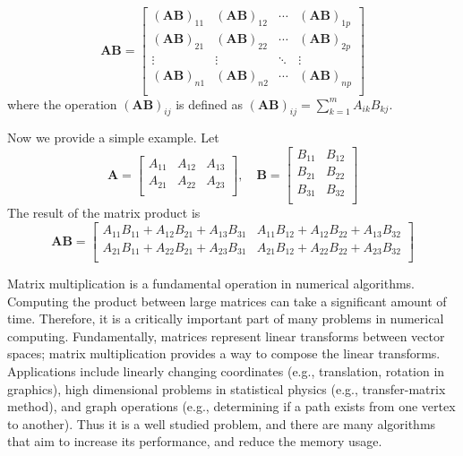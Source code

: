 \begin{equation}
\mathbf{AB} = \begin{bmatrix}
 \left(\mathbf{AB}\right)_{11} & \left(\mathbf{AB}\right)_{12} & \cdots & \left(\mathbf{AB}\right)_{1p} \\
 \left(\mathbf{AB}\right)_{21} & \left(\mathbf{AB}\right)_{22} & \cdots & \left(\mathbf{AB}\right)_{2p} \\
\vdots & \vdots & \ddots & \vdots \\
 \left(\mathbf{AB}\right)_{n1} & \left(\mathbf{AB}\right)_{n2} & \cdots & \left(\mathbf{AB}\right)_{np} \\
\end{bmatrix}
\end{equation} where the operation $\left(\mathbf{AB}\right)_{ij}$ is defined as $\left(\mathbf{A}\mathbf{B}\right)_{ij} = \sum_{k=1}^m A_{ik}B_{kj}$.

Now we provide a simple example. Let
\begin{equation}
\mathbf{A} =
 \begin{bmatrix}
 \label{eq:ABmatrix}
  A_{11} & A_{12}  &  A_{13} \\
  A_{21} & A_{22} & A_{23} \\
 \end{bmatrix},  \quad
\mathbf{B} =
 \begin{bmatrix}
  B_{11} & B_{12}  \\
  B_{21} & B_{22}   \\
   B_{31} & B_{32}  \\
 \end{bmatrix}
\end{equation}
The result of the matrix product is
\begin{equation}\label{eq:ABmatrix_product}\mathbf{AB} = \begin{bmatrix}
 A_{11}B_{11} + A_{12}B_{21} + A_{13}B_{31} & A_{11}B_{12} + A_{12}B_{22} + A_{13}B_{32} \\
 A_{21}B_{11} + A_{22}B_{21} + A_{23}B_{31} & A_{21}B_{12} + A_{22}B_{22} + A_{23}B_{32}\\
\end{bmatrix}
\end{equation}

Matrix multiplication is a fundamental operation in numerical algorithms. Computing the product between large matrices can take a significant amount of time. Therefore, it is a critically important part of many problems in numerical computing. Fundamentally, matrices represent linear transforms between vector spaces; matrix multiplication provides a way to compose the linear transforms.  Applications include linearly changing coordinates (e.g., translation, rotation in graphics), high dimensional problems in statistical physics (e.g., transfer-matrix method), and graph operations (e.g., determining if a path exists from one vertex to another). Thus it is a well studied problem, and there are many algorithms that aim to increase its performance, and reduce the memory usage.

